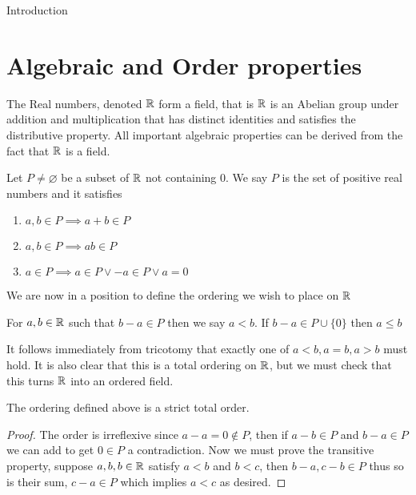 \begin{chapter}{Introduction}
    \section{Algebraic and Order properties}
    The Real numbers, denoted $\mathbb{R}$ form a field, that is $\mathbb{R}$ is an Abelian group under addition and multiplication that 
    has distinct identities and satisfies the distributive property. All important algebraic properties can be derived from the fact 
    that $\mathbb{R}$ is a field. 

    
    \begin{defn}   
        Let $P \neq \varnothing$ be a subset of $\mathbb{R}$ not containing $0$. We say $P$ is the set of positive real numbers and it satisfies 
        
        \begin{enumerate}
           \item  $a, b \in  P \implies a + b \in P$
           \item $a,b \in P \implies ab \in P$ 
           \item $a \in P \implies a \in P \vee -a \in P \vee  a = 0$
            
        \end{enumerate}
    \end{defn}

    We are now in a position to define the ordering we wish to place on $\mathbb{R}$ 

    
    \begin{defn}
        For $a, b \in \mathbb{R}$ such that $b - a \in P$ then we say $a < b$. 
        If $b -a \in P \cup \{0\}$ then $a \leq b$
    \end{defn}

    It follows immediately from tricotomy that exactly one of $a < b, a = b, a > b$ must hold. 
    It is also clear that this is a total ordering on $\mathbb{R}$, but we must check that this turns $\mathbb{R}$ into an ordered field. 

    
    \begin{lem}
        The ordering defined above is a strict total order. 
    \end{lem}

    
    \begin{proof}
        The order is irreflexive since $a-a = 0 \notin P$, then if $a - b \in P$ and $b - a \in P$ we can add to get 
        $0 \in P$ a contradiction. Now we must prove the transitive property, suppose $a, b, b \in \mathbb{R}$ satisfy 
        $a < b $ and $b < c$, then $b - a, c - b \in P$ thus so is their sum, $c - a \in P$ which implies $a < c$ as desired. 
    \end{proof}


\end{chapter}

